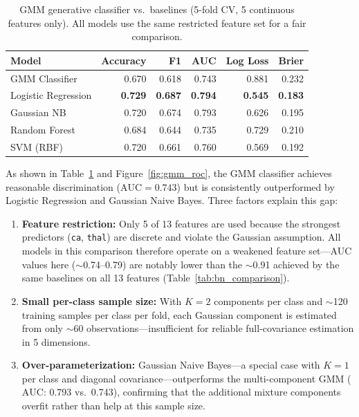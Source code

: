 \begin{table}[h]
\centering
\caption{GMM generative classifier vs.\ baselines (5-fold CV, 5 continuous features only). All models use the same restricted feature set for a fair comparison.}
\label{tab:gmm_classifier}
\begin{tabular}{lrrrrr}
\hline
\textbf{Model} & \textbf{Accuracy} & \textbf{F1} & \textbf{AUC} & \textbf{Log Loss} & \textbf{Brier} \\ \hline
GMM Classifier & 0.670 & 0.618 & 0.743 & 0.881 & 0.232 \\
Logistic Regression & \textbf{0.729} & \textbf{0.687} & \textbf{0.794} & \textbf{0.545} & \textbf{0.183} \\
Gaussian NB & 0.720 & 0.674 & 0.793 & 0.626 & 0.195 \\
Random Forest & 0.684 & 0.644 & 0.735 & 0.729 & 0.210 \\
SVM (RBF) & 0.720 & 0.661 & 0.760 & 0.569 & 0.192 \\ \hline
\end{tabular}
\end{table}

As shown in Table~\ref{tab:gmm_classifier} and Figure~\ref{fig:gmm_roc}, the GMM classifier achieves reasonable discrimination ($\text{AUC} = 0.743$) but is consistently outperformed by Logistic Regression and Gaussian Naive Bayes. Three factors explain this gap:

\begin{enumerate}
    \item \textbf{Feature restriction:} Only 5 of 13 features are used because the strongest predictors (\texttt{ca}, \texttt{thal}) are discrete and violate the Gaussian assumption. All models in this comparison therefore operate on a weakened feature set---AUC values here ($\sim$0.74--0.79) are notably lower than the $\sim$0.91 achieved by the same baselines on all 13 features (Table~\ref{tab:bn_comparison}).
    \item \textbf{Small per-class sample size:} With $K\!=\!2$ components per class and $\sim$120 training samples per class per fold, each Gaussian component is estimated from only $\sim$60 observations---insufficient for reliable full-covariance estimation in 5 dimensions.
    \item \textbf{Over-parameterization:} Gaussian Naive Bayes---a special case with $K\!=\!1$ per class and diagonal covariance---outperforms the multi-component GMM ($\text{AUC}$: 0.793 vs.\ 0.743), confirming that the additional mixture components overfit rather than help at this sample size.
\end{enumerate}


